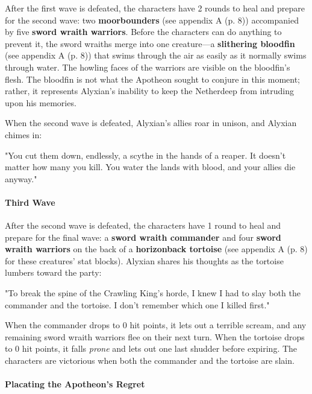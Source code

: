 \documentclass[a4paper, 11pt, bg=full, twocolumn, nooutline]{dndbook}
\begin{document}
After the first wave is defeated, the characters have 2 rounds to heal and prepare for the second wave: two \textbf{moorbounders} (see appendix A (p. 8)) accompanied by five \textbf{sword wraith warriors}. Before the characters can do anything to prevent it, the sword wraiths merge into one creature---a \textbf{slithering bloodfin} (see appendix A (p. 8)) that swims through the air as easily as it normally swims through water. The howling faces of the warriors are visible on the bloodfin's flesh. The bloodfin is not what the Apotheon sought to conjure in this moment; rather, it represents Alyxian's inability to keep the Netherdeep from intruding upon his memories.

When the second wave is defeated, Alyxian's allies roar in unison, and Alyxian chimes in:

\begin{DndReadAloud}
"You cut them down, endlessly, a scythe in the hands of a reaper. It doesn't matter how many you kill. You water the lands with blood, and your allies die anyway."
\end{DndReadAloud}

\paragraph{Third Wave}

After the second wave is defeated, the characters have 1 round to heal and prepare for the final wave: a \textbf{sword wraith commander} and four \textbf{sword wraith warriors} on the back of a \textbf{horizonback tortoise} (see appendix A (p. 8) for these creatures' stat blocks). Alyxian shares his thoughts as the tortoise lumbers toward the party:

\begin{DndReadAloud}
"To break the spine of the Crawling King's horde, I knew I had to slay both the commander and the tortoise. I don't remember which one I killed first."
\end{DndReadAloud}

When the commander drops to 0 hit points, it lets out a terrible scream, and any remaining sword wraith warriors flee on their next turn. When the tortoise drops to 0 hit points, it falls \textit{prone} and lets out one last shudder before expiring. The characters are victorious when both the commander and the tortoise are slain.

\paragraph{Placating the Apotheon's Regret}
\end{document}
